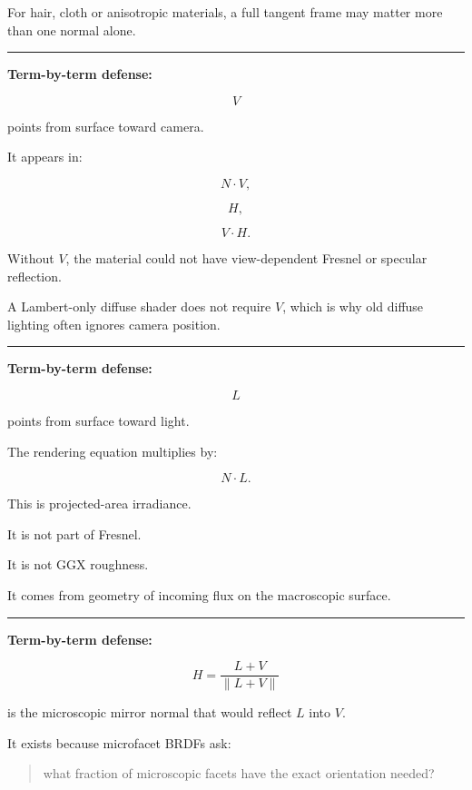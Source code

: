 For hair, cloth or anisotropic materials, a full tangent frame may matter more than one normal alone.

\begin{center}\rule{0.5\linewidth}{0.5pt}\end{center}

\textbf{Term-by-term defense: }

\[
V
\]

points from surface toward camera.

It appears in:

\[
N\cdot V,
\]

\[
H,
\]

\[
V\cdot H.
\]

Without \(V\), the material could not have view-dependent Fresnel or specular reflection.

A Lambert-only diffuse shader does not require \(V\), which is why old diffuse lighting often ignores camera position.

\begin{center}\rule{0.5\linewidth}{0.5pt}\end{center}

\textbf{Term-by-term defense: }

\[
L
\]

points from surface toward light.

The rendering equation multiplies by:

\[
N\cdot L.
\]

This is projected-area irradiance.

It is not part of Fresnel.

It is not GGX roughness.

It comes from geometry of incoming flux on the macroscopic surface.

\begin{center}\rule{0.5\linewidth}{0.5pt}\end{center}

\textbf{Term-by-term defense: }

\[
H=
\frac{L+V}{\|L+V\|}
\]

is the microscopic mirror normal that would reflect \(L\) into \(V\).

It exists because microfacet BRDFs ask:

\begin{quote}
what fraction of microscopic facets have the exact orientation needed?
\end{quote}

